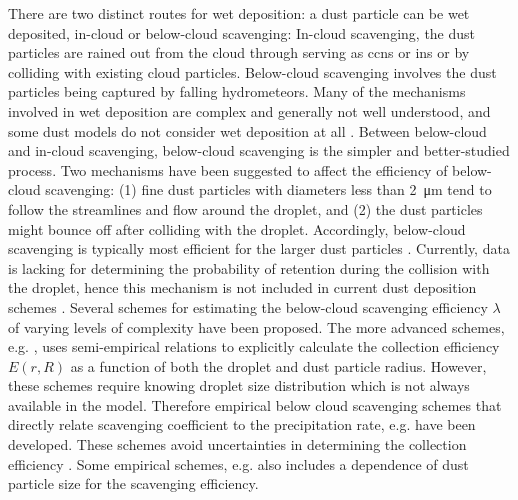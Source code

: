 There are two distinct routes for wet deposition: a dust particle can be wet deposited, in-cloud or below-cloud scavenging: 
In-cloud scavenging, the dust particles are rained out from the cloud through serving as \acrshort{ccn}s or \acrshort{in}s or by colliding with existing cloud particles. Below-cloud scavenging involves the dust particles being captured by falling hydrometeors. 
Many of the mechanisms involved in wet deposition are complex and generally not well understood, and some dust models do not consider wet deposition at all \parencite{zhang2019parameterization}. Between below-cloud and in-cloud scavenging, below-cloud scavenging is the simpler and better-studied process.
Two mechanisms have been suggested to affect the efficiency of below-cloud scavenging: (1) fine dust particles with diameters less than \SI{2}{\micro\metre} tend to follow the streamlines and flow around the droplet, and (2) the dust particles might bounce off after colliding with the droplet. 
Accordingly, below-cloud scavenging is typically most efficient for the larger dust particles \parencite{jung2006intercomparison}.
Currently, data is lacking for determining the probability of retention during the collision with the droplet, hence this mechanism is not included in current dust deposition schemes \parencite{ShaoYaping2008PaMo}. Several schemes for estimating the below-cloud scavenging efficiency $\lambda$ of varying levels of complexity have been proposed. 
The more advanced schemes, e.g. \textcite{seinfeld1998atmospheric, ShaoYaping2008PaMo}, uses semi-empirical relations to explicitly calculate the collection efficiency $E(r,R)$ as a function of both the droplet and dust particle radius.
However, these schemes require knowing droplet size distribution which is not always available in the model. 
Therefore empirical below cloud scavenging schemes that directly relate scavenging coefficient to the precipitation rate, e.g. \textcite{brandt2002modelling} have been developed. 
These schemes avoid uncertainties in determining the collection efficiency \parencite{jung2006intercomparison}. 
Some empirical schemes, e.g. \textcite{laakso2003ultrafine} also includes a dependence of dust particle size for the scavenging efficiency. 
